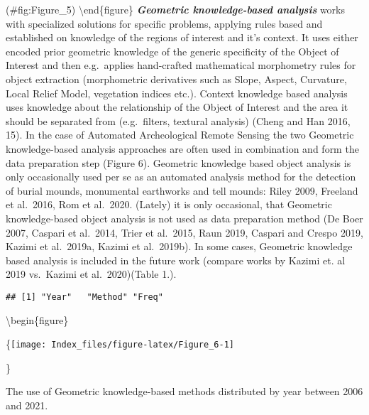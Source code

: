 \documentclass[
]{article}
\begin{document}
(\#fig:Figure\_5)
\textbackslash end\{figure\}
\textbf{\emph{Geometric knowledge-based analysis}} works with specialized solutions for specific problems, applying rules based and established on knowledge of the regions of interest and it's context. It uses either encoded prior geometric knowledge of the generic specificity of the Object of Interest and then e.g.~applies hand-crafted mathematical morphometry rules for object extraction (morphometric derivatives such as Slope, Aspect, Curvature, Local Relief Model, vegetation indices etc.). Context knowledge based analysis uses knowledge about the relationship of the Object of Interest and the area it should be separated from (e.g.~filters, textural analysis) (Cheng and Han 2016, 15). In the case of Automated Archeological Remote Sensing the two Geometric knowledge-based analysis approaches are often used in combination and form the data preparation step (Figure 6). Geometric knowledge based object analysis is only occasionally used per se as an automated analysis method for the detection of burial mounds, monumental earthworks and tell mounds: Riley 2009, Freeland et al.~2016, Rom et al.~2020. (Lately) it is only occasional, that Geometric knowledge-based object analysis is not used as data preparation method (De Boer 2007, Caspari et al.~2014, Trier et al.~2015, Raun 2019, Caspari and Crespo 2019, Kazimi et al.~2019a, Kazimi et al.~2019b). In some cases, Geometric knowledge based analysis is included in the future work (compare works by Kazimi et. al 2019 vs.~Kazimi et al.~2020)(Table 1.).

\begin{verbatim}
## [1] "Year"   "Method" "Freq"
\end{verbatim}

\textbackslash begin\{figure\}

\{\centering \texttt{[image: Index\_files/figure-latex/Figure\_6-1]}

\}

\caption{The use of Geometric knowledge-based methods distributed by year between 2006 and 2021.}
\end{document}
